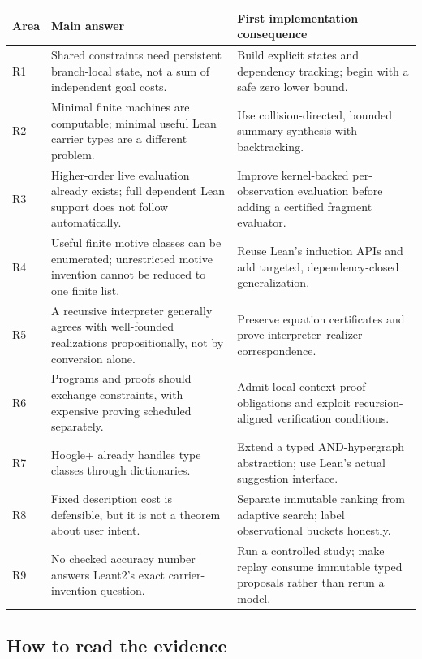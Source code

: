 \documentclass[11pt,a4paper]{article}
\theoremstyle{remark}
\begin{document}
\begin{longtable}{@{}L{10mm}L{56mm}L{84mm}@{}}
\toprule
Area & Main answer & First implementation consequence\\
\midrule
\endhead
R1 & Shared constraints need persistent branch-local state, not a sum of independent goal costs. & Build explicit states and dependency tracking; begin with a safe zero lower bound.\\
R2 & Minimal finite machines are computable; minimal useful Lean carrier types are a different problem. & Use collision-directed, bounded summary synthesis with backtracking.\\
R3 & Higher-order live evaluation already exists; full dependent Lean support does not follow automatically. & Improve kernel-backed per-observation evaluation before adding a certified fragment evaluator.\\
R4 & Useful finite motive classes can be enumerated; unrestricted motive invention cannot be reduced to one finite list. & Reuse Lean's induction APIs and add targeted, dependency-closed generalization.\\
R5 & A recursive interpreter generally agrees with well-founded realizations propositionally, not by conversion alone. & Preserve equation certificates and prove interpreter--realizer correspondence.\\
R6 & Programs and proofs should exchange constraints, with expensive proving scheduled separately. & Admit local-context proof obligations and exploit recursion-aligned verification conditions.\\
R7 & Hoogle+ already handles type classes through dictionaries. & Extend a typed AND-hypergraph abstraction; use Lean's actual suggestion interface.\\
R8 & Fixed description cost is defensible, but it is not a theorem about user intent. & Separate immutable ranking from adaptive search; label observational buckets honestly.\\
R9 & No checked accuracy number answers Leant2's exact carrier-invention question. & Run a controlled study; make replay consume immutable typed proposals rather than rerun a model.\\
\bottomrule
\end{longtable}

\subsection{How to read the evidence}
\end{document}
